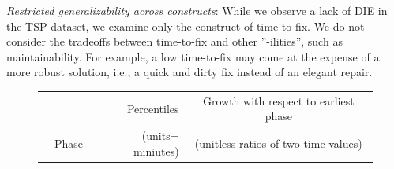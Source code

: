 \documentclass[smallcondensed]{svjour3}
\def\baselinestretch{1}
\begin{document}
\textit{Restricted generalizability across constructs}: While we observe a lack of DIE in the TSP dataset, we examine only the construct of time-to-fix. We do not consider the tradeoffs between time-to-fix and other ''-ilities'', such as maintainability. For example, a low time-to-fix may come at the expense of a more robust solution, i.e., a quick and dirty fix instead of an elegant repair.

\begin{figure}[!t]
\begin{center}
\scriptsize
\begin{tabular}{c|lr|r|rl}
  & \multicolumn{2}{c|}{ } &  Percentiles & \multicolumn{2}{c}{Growth with respect to earliest phase  } \\ 
   & \multicolumn{2}{c|}{Phase} &  (units= miniutes) & \multicolumn{2}{c}{(unitless ratios of two time values) } \\\hline



\end{tabular}
\end{center}
\end{figure}
\end{document}
